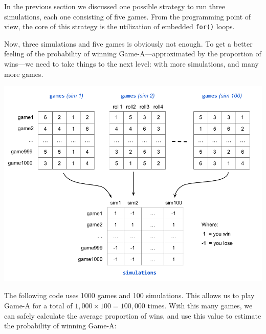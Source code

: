 \documentclass[
]{book}
\begin{document}
In the previous section we discussed one possible strategy to run three
simulations, each one consisting of five games. From the programming point of
view, the core of this strategy is the utilization of embedded \texttt{for()} loops.

Now, three simulations and five games is obviously not enough. To get a better
feeling of the probability of winning Game-A---approximated by the proportion
of wins---we need to take things to the next level: with more simulations, and
many more games.

\begin{center}\includegraphics[width=0.9\linewidth]{images/demere-100-sims-loop} \end{center}

The following code uses 1000 games and 100 simulations. This allows us to
play Game-A for a total of \(1,000 \times 100 = 100,000\) times. With this many
games, we can safely calculate the average proportion of wins, and use this
value to estimate the probability of winning Game-A:
\end{document}
